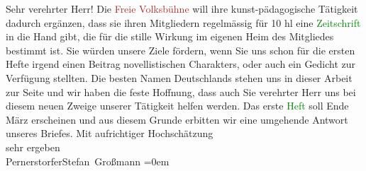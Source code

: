            \pstart\center{}Sehr verehrter Herr!\pend\pstart
           Die \textcolor{brown}{Freie Volksbühne}{}\ledrightnote{\textcolor{brown}{Wiener Freie Volksbühne}} will ihre
                    kunst-pädagogische Tätigkeit dadurch ergänzen, dass sie ihren Mitgliedern
                    regelmässig für 10 hl eine \textcolor{green}{Zeitschrift}{} in die Hand gibt, die für die stille Wirkung im eigenen
                    Heim des Mitgliedes bestimmt ist. Sie würden unsere Ziele fördern, wenn Sie uns
                    schon für die ersten Hefte irgend einen Beitrag novellistischen Charakters, oder
                    auch ein Gedicht zur Verfügung stellten. Die besten Namen Deutschlands stehen
                    uns in dieser Arbeit zur Seite und wir haben die feste Hoffnung, dass auch Sie
                    verehrter Herr uns bei diesem neuen Zweige unserer Tätigkeit helfen werden.\pend
           \pstart
           Das erste \textcolor{green}{Heft}{} soll
                        Ende März erscheinen und aus diesem Grunde erbitten wir eine
                    umgehende Antwort unseres Briefes.\pend
           \pstart
           Mit aufrichtiger Hochschätzung{\\[\baselineskip]} sehr ergeben{\\[\baselineskip]}\spacefill\mbox{Pernerstorfer}\hspace*{1.5em}\spacefill\mbox{Stefan Großmann}\pend
           \leftskip=0em{}\endnumbering{}  
      